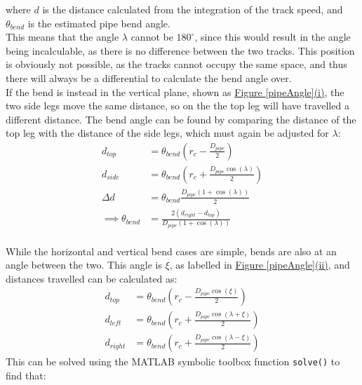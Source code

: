 \documentclass[11pt]{article}		%
\begin{document}
			where $d$ is the distance calculated from the integration of the track speed, and $\theta_{bend}$ is the estimated pipe bend angle.
			\\
	        \hspace*{2ex}This means that the angle $\lambda$ cannot be $180^\circ$, since this would result in the angle being incalculable, as there is no difference between the two tracks.
			This position is obviously not possible, as the tracks cannot occupy the same space, and thus there will always be a differential to calculate the bend angle over.
			\\
	        \hspace*{2ex}If the bend is instead in the vertical plane, shown as \hyperref[pipeAngle]{Figure \ref*{pipeAngle}(i)}, the two side legs move the same distance, so on the the top leg will have travelled a different distance.
			The bend angle can be found by comparing the distance of the top leg with the distance of the side legs, which must again be adjusted for $\lambda$:
			\begin{align}
				d_{top} &= \theta_{bend} \left( r_c  - \frac{ D_{pipe} }{2} \right)
				\\
				d_{side} &= \theta_{bend} \left( r_c + \frac{D_{pipe} \cos \left( \lambda \right)} {2} \right)
				\\
				\Delta d &= \theta_{bend} \frac{ D_{pipe} \left( 1 + \cos \left( \lambda \right) \right)}{2}
				\\
				\implies \theta_{bend} &= \frac{2 \left( d_{right} - d_{top} \right)}{D_{pipe} \left( 1 + \cos \left( \lambda \right) \right)}
			\end{align}
			\\
	        \hspace*{2ex}While the horizontal and vertical bend cases are simple, bends are also at an angle between the two.
			This angle is $\xi$, as labelled in \hyperref[pipeAngle]{Figure \ref*{pipeAngle}(ii)}, and distances travelled can be calculated as:
			\begin{align}
				d_{top} &= \theta_{bend} \left( r_c - \frac{D_{pipe} \cos \left( \xi \right)}{2} \right) \label{d_top}
				\\
				d_{left} &= \theta_{bend} \left( r_c +  \frac{D_{pipe} \cos \left( \lambda + \xi \right)}{2} \right) \label{d_left}
				\\
				d_{right} &= \theta_{bend} \left( r_c +  \frac{D_{pipe} \cos \left( \lambda - \xi \right)}{2} \right) \label{d_right}
			\end{align}
			This can be solved using the MATLAB symbolic toolbox function \verb|solve()| to find that:
\end{document}
